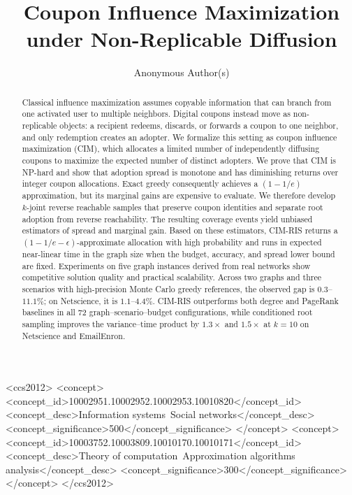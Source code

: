 \documentclass[sigconf,balance=false]{acmart}
\newcommand{\CIMRIS}{\textsc{CIM-RIS}}
\begin{document}
\title{Coupon Influence Maximization under Non-Replicable Diffusion}

\author{Anonymous Author(s)}

\renewcommand{\shortauthors}{Anon.}

\begin{abstract}
Classical influence maximization assumes copyable information that can
branch from one activated user to multiple neighbors.
Digital coupons instead move as non-replicable objects: a recipient
redeems, discards, or forwards a coupon to one neighbor, and only
redemption creates an adopter.
We formalize this setting as coupon influence maximization (CIM), which
allocates a limited number of independently diffusing coupons to maximize
the expected number of distinct adopters.
We prove that CIM is NP-hard and show that adoption spread is monotone
and has diminishing returns over integer coupon allocations.
Exact greedy consequently achieves a $(1-1/e)$ approximation, but its
marginal gains are expensive to evaluate.
We therefore develop $k$-joint reverse reachable samples that preserve
coupon identities and separate root adoption from reverse reachability.
The resulting coverage events yield unbiased estimators of spread and
marginal gain.
Based on these estimators, \CIMRIS{} returns a
$(1-1/e-\epsilon)$-approximate allocation with high probability and runs
in expected near-linear time in the graph size when the budget, accuracy,
and spread lower bound are fixed.
Experiments on five graph instances derived from real networks show
competitive solution quality and practical scalability. Across two graphs
and three scenarios with high-precision Monte Carlo greedy references, the
observed gap is $0.3$--$11.1\%$; on Netscience, it is $1.1$--$4.4\%$.
\CIMRIS{} outperforms both degree and PageRank baselines in all 72
graph--scenario--budget configurations, while
conditioned root sampling improves the variance--time product by
$1.3\times$ and $1.5\times$ at $k=10$ on Netscience and EmailEnron.
\end{abstract}

\begin{CCSXML}
<ccs2012>
 <concept>
  <concept_id>10002951.10002952.10002953.10010820</concept_id>
  <concept_desc>Information systems~Social networks</concept_desc>
  <concept_significance>500</concept_significance>
 </concept>
 <concept>
  <concept_id>10003752.10003809.10010170.10010171</concept_id>
  <concept_desc>Theory of computation~Approximation algorithms analysis</concept_desc>
  <concept_significance>300</concept_significance>
 </concept>
</ccs2012>
\end{CCSXML}
\end{document}
